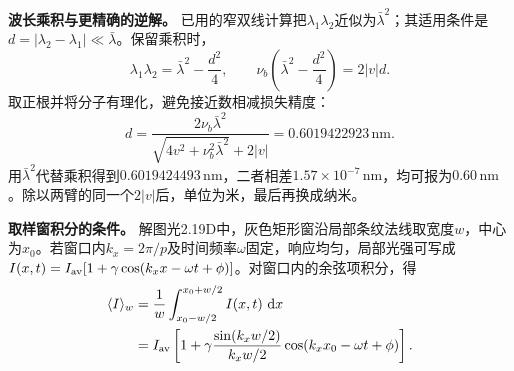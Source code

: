 \documentclass[UTF8,fontset=fandol,a4paper,11pt]{ctexart}
\newcommand{\dd}{\mathop{}\!\mathrm{d}}
\begin{document}
\noindent\textbf{波长乘积与更精确的逆解。}
已用的窄双线计算把$\lambda_1\lambda_2$近似为$\bar\lambda^2$；其适用条件是$d=|\lambda_2-\lambda_1|\ll\bar\lambda$。保留乘积时，
\[
\lambda_1\lambda_2=\bar\lambda^2-\frac{d^2}{4},\qquad
\nu_b\left(\bar\lambda^2-\frac{d^2}{4}\right)=2|v|d.
\]
取正根并将分子有理化，避免接近数相减损失精度：
\[
d=\frac{2\nu_b\bar\lambda^2}
{\sqrt{4v^2+\nu_b^2\bar\lambda^2}+2|v|}
=0.6019422923\,\mathrm{nm}.
\]
用$\bar\lambda^2$代替乘积得到$0.6019424493\,\mathrm{nm}$，二者相差$1.57\times10^{-7}\,\mathrm{nm}$，均可报为$0.60\,\mathrm{nm}$。除以两臂的同一个$2|v|$后，单位为米，最后再换成纳米。

\noindent\textbf{取样窗积分的条件。}
解图光2.19D中，灰色矩形窗沿局部条纹法线取宽度$w$，中心为$x_0$。若窗口内$k_x=2\pi/p$及时间频率$\omega$固定，响应均匀，局部光强可写成$I(x,t)=I_{\rm av}[1+\gamma\cos(k_xx-\omega t+\phi)]$。对窗口内的余弦项积分，得
\[
\begin{aligned}
\langle I\rangle_w
&=\frac1w\int_{x_0-w/2}^{x_0+w/2}I(x,t)\,\dd x\\
&=I_{\rm av}\left[1+\gamma
\frac{\sin(k_xw/2)}{k_xw/2}\cos(k_xx_0-\omega t+\phi)\right].
\end{aligned}
\]
\end{document}
